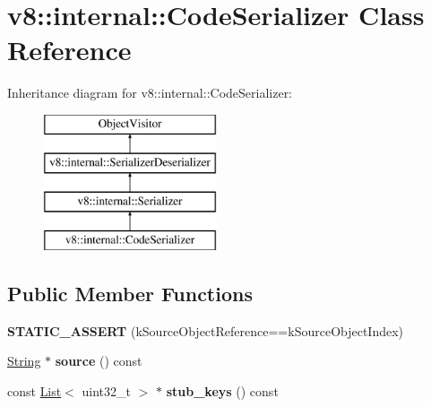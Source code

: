 \hypertarget{classv8_1_1internal_1_1_code_serializer}{}\section{v8\+:\+:internal\+:\+:Code\+Serializer Class Reference}
\label{classv8_1_1internal_1_1_code_serializer}
Inheritance diagram for v8\+:\+:internal\+:\+:Code\+Serializer\+:\begin{figure}[H]
\begin{center}
\leavevmode
\includegraphics[height=4.000000cm]{classv8_1_1internal_1_1_code_serializer}
\end{center}
\end{figure}
\subsection*{Public Member Functions}
\begin{DoxyCompactItemize}
\item 
{\bfseries S\+T\+A\+T\+I\+C\+\_\+\+A\+S\+S\+E\+RT} (k\+Source\+Object\+Reference==k\+Source\+Object\+Index)\hypertarget{classv8_1_1internal_1_1_code_serializer_a2b0174eccb2b3fea6e1e87131e1e39e9}{}\label{classv8_1_1internal_1_1_code_serializer_a2b0174eccb2b3fea6e1e87131e1e39e9}

\item 
\hyperlink{classv8_1_1internal_1_1_string}{String} $\ast$ {\bfseries source} () const \hypertarget{classv8_1_1internal_1_1_code_serializer_a3e3cc33f183a432ff8df8615dc2a351f}{}\label{classv8_1_1internal_1_1_code_serializer_a3e3cc33f183a432ff8df8615dc2a351f}

\item 
const \hyperlink{classv8_1_1internal_1_1_list}{List}$<$ uint32\+\_\+t $>$ $\ast$ {\bfseries stub\+\_\+keys} () const \hypertarget{classv8_1_1internal_1_1_code_serializer_aaf9b3195f3052f43ea117fbce2060fe7}{}\label{classv8_1_1internal_1_1_code_serializer_aaf9b3195f3052f43ea117fbce2060fe7}

\end{DoxyCompactItemize}
